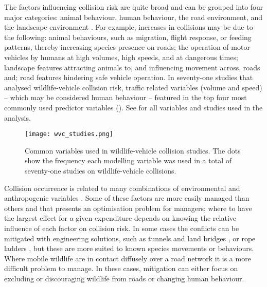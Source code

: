The factors influencing collision risk are quite broad and can be grouped into four major categories: animal behaviour, human behaviour, the road environment, and the landscape environment \citep{form03}. For example, increases in collisions may be due to the following: animal behaviours, such as migration, flight response, or feeding patterns, thereby increasing species presence on roads; the operation of motor vehicles by humans at high volumes, high speeds, and at dangerous times; landscape features attracting animals to, and influencing movement across, roads and; road features hindering safe vehicle operation. In seventy-one studies that analysed wildlife-vehicle collision risk, traffic related variables (volume and speed) -- which may be considered human behaviour -- featured in the top four most commonly used predictor variables (). See  for all variables and studies used in the analysis.

\begin{figure*}[!t]
  \centering
  \texttt{[image: wvc\_studies.png]}
  \caption[Variables used in wildlife-vehicle collision studies]{Common variables used in wildlife-vehicle collision studies. The dots show the frequency each modelling variable was used in a total of seventy-one studies on wildlife-vehicle collisions.}
  \label{wvc_studies}
\end{figure*}

Collision occurrence is related to many combinations of environmental and anthropogenic variables \citep{barn07}. Some of these factors are more easily managed than others and that presents an optimisation problem for managers; where to have the largest effect for a given expenditure depends on knowing the relative influence of each factor on collision risk. In some cases the conflicts can be mitigated with engineering solutions, such as tunnels and land bridges \citep{bond08}, or rope ladders \citep{soan13}, but these are more suited to known species movements or behaviours. Where mobile wildlife are in contact diffusely over a road network it is a more difficult problem to manage. In these cases, mitigation can either focus on excluding or discouraging wildlife from roads or changing human behaviour.

